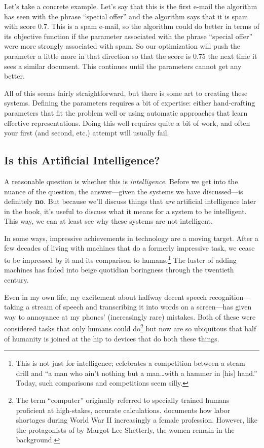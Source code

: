 Let's take a concrete example.  Let's say that this is the first
e-mail the algorithm has seen with the phrase ``special offer'' and the algorithm says that it
is spam with score 0.7.  This is a spam e-mail, so the algorithm could
do better in terms of its objective function if the parameter
associated with the phrase ``special offer'' were more strongly
associated with spam.  So our optimization will push the parameter a
little more in that direction so that the score is 0.75 the next time
it sees a similar document.  This continues until the parameters
cannot get any better.

All of this seems fairly straightforward, but there is some art to
creating these systems.  Defining the parameters requires a bit of
expertise: either hand-crafting parameters that fit the problem well
or using automatic approaches that learn effective representations.
Doing this well requires quite a bit of work, and often your first
(and second, etc.) attempt will usually fail.

\subsection{Is this Artificial Intelligence?}

A reasonable question is whether this is \emph{intelligence}.  Before
we get into the nuance of the question, the answer---given the systems
we have discussed---is definitely \textbf{no}.  But because we'll
discuss things that \emph{are} artificial intelligence later in the
book, it's useful to discuss what it means for a system to be
intelligent.  This way, we can at least see why these systems are
not intelligent.

In some ways, impressive achievements in technology are a moving
target.  After a few decades of living with machines that do a
formerly impressive task, we cease to be impressed by it and its
comparison to humans.\footnote{This is not just for intelligence;
   celebrates a competition between a
  steam drill and ``a man who ain't nothing but a man\dots with a
  hammer in [his] hand.''  Today, such comparisons and competitions
  seem silly.}  The luster of adding machines has faded into beige
quotidian boringness through the twentieth century.

Even in my own life, my excitement about halfway decent speech
recognition---taking a stream of speech and transcribing it into words
on a screen---has given way to annoyance at my phones' (increasingly
rare) mistakes.  Both of these were considered tasks that only humans
could do\footnote{The term ``computer'' originally referred to
  specially trained humans proficient at high-stakes, accurate
  calculations.  \citet{light-99} documents how labor shortages during
  World War II increasingly a female profession.  However, like the
  protagonists of  by Margot Lee Shetterly, the
  women remain in the background.} but now are so ubiquitous that half
of humanity is joined at the hip to devices that do both these things.

